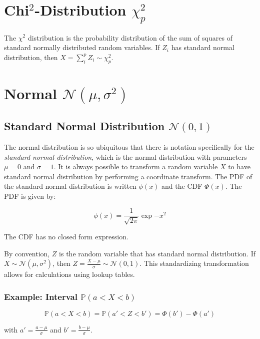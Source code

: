 \section{Chi$^2$-Distribution $\chi^2_p$}
The $\chi^2$ distribution is the probability distribution of the sum of squares of standard normally distributed random variables. If $Z_i$ has standard normal distribution, then $X = \sum_i^p Z_i \sim \chi^2_p$.


\section{Normal $\mathscr{N}(\mu,\sigma^2)$}


\subsection{Standard Normal Distribution $\mathscr{N}(0,1)$ }

The normal distribution is so ubiquitous that there is notation specifically for the \textit{standard normal distribution}, which is the normal distribution with parameters $\mu = 0$ and $\sigma = 1$. It is always possible to transform a random variable $X$ to have standard normal distribution by performing a coordinate transform. The PDF of the standard normal distribution is written $\phi(x)$ and the CDF $\Phi(x)$. The PDF is given by: 

\begin{equation}
\phi(x) = \frac{1}{\sqrt{2\pi}}\exp{-x^2}
\end{equation}

The CDF has no closed form expression. 

By convention, $Z$ is the random variable that has standard normal distribution. If $X \sim \mathscr{N}(\mu,\sigma^2)$, then $Z = \frac{X-\mu}{\sigma} \sim \mathscr{N}(0,1)$. This standardizing transformation allows for calculations using lookup tables. 

\subsubsection{Example: Interval $\mathbb{P}(a<X<b)$}

\begin{equation}
\mathbb{P}(a<X<b) =  \mathbb{P}(a' < Z < b') = \Phi(b') - \Phi(a')
\end{equation}

with $a' = \frac{a-\mu}{\sigma}$ and $b' = \frac{b-\mu}{\sigma}$.

